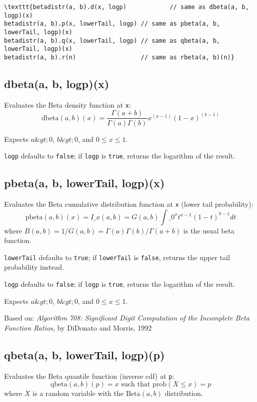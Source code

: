\documentclass{article}
\begin{document}
\begin{lstlisting}
\texttt{betadistr(a, b).d(x, logp)            // same as dbeta(a, b, logp)(x)
betadistr(a, b).p(x, lowerTail, logp) // same as pbeta(a, b, lowerTail, logp)(x)
betadistr(a, b).q(x, lowerTail, logp) // same as qbeta(a, b, lowerTail, logp)(x)
betadistr(a, b).r(n)                  // same as rbeta(a, b)(n)}\end{lstlisting}

    \subsection*{dbeta(a, b, logp)(x)}
    Evaluates the Beta density function at \texttt{x}:
$$\textrm{dbeta}(a,b)(x) = \frac{\Gamma(a+b)}{\Gamma(a)\Gamma(b)}x^{(a-1)}(1-x)^{(b-1)}$$


Expects $a \&gt; 0$, $b \&gt; 0$, and $0 \leq x \leq 1$.


\texttt{logp} defaults to \texttt{false}; if \texttt{logp} is \texttt{true}, returns the
logarithm of the result.


    \subsection*{pbeta(a, b, lowerTail, logp)(x)}
    Evaluates the Beta cumulative distribution
function at \texttt{x} (lower tail probability):
$$\textrm{pbeta}(a, b)(x) = I\_x(a, b)=G(a,b)\int\_0^xt^{a-1}(1-t)^{b-1}dt$$
where $B(a,b)=1/G(a,b) = \Gamma(a)\Gamma(b)/\Gamma(a+b)$ is the
usual beta function.


\texttt{lowerTail} defaults to \texttt{true}; if \texttt{lowerTail} is \texttt{false}, returns
the upper tail probability instead.


\texttt{logp} defaults to \texttt{false}; if \texttt{logp} is \texttt{true}, returns the logarithm
of the result.


Expects $a\&gt;0$, $b\&gt;0$, and $0 \leq x \leq 1$.


Based on: \emph{Algorithm 708: Significant Digit Computation of the Incomplete Beta Function
Ratios}, by DiDonato and Morris, 1992


    \subsection*{qbeta(a, b, lowerTail, logp)(p)}
    Evaluates the Beta quantile function (inverse cdf) at \texttt{p}:
$$\textrm{qbeta}(a, b)(p) = x \textrm{ such that } \textrm{prob}(X \leq x) = p$$
where $X$ is a random variable with the $\textrm{Beta}(a,b)$ distribution.
\end{document}

